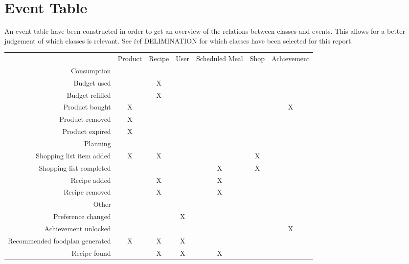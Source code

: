 \section{Event Table}
An event table have been constructed in order to get an overview of the relations between classes and events. This allows for a better judgement of which classes is relevant. See \.ref DELIMINATION for which classes have been selected for this report.
\begin{table}[h]
\begin{tabular}{r c c c c c c}
                          \vline           & Product& Recipe & User & Scheduled Meal & Shop & Achievement\\
 Consumption              \vline           &        &        &      &                &      &            \\   
 \hline    
 Budget used    		  \vline           &        &      X &      &                &      &            \\
 Budget refilled		  \vline	       &        &      X &      &                &      &            \\
 Product bought 		  \vline    	   &     X  &        &      &                &      &          X \\
 Product removed		  \vline    	   &     X  &        &      &                &      &            \\
 Product expired		  \vline	       &     X  &        &      &                &      &            \\
 \hline				
 Planning   	          \vline           &        &        &      &                &      &            \\
 \hline 
 Shopping list item added \vline    	   &     X  &      X &      &                &    X &            \\
 Shopping list completed  \vline	       &        &        &      &              X &    X &            \\
 Recipe added			  \vline	       &        &      X &      &              X &      &            \\
 Recipe removed           \vline	       &        &      X &      &              X &      &            \\
 \hline           
 Other                    \vline           &        &        &      &                &      &            \\ 
 \hline        
 Preference changed       \vline	       &        &        &   X  &                &      &            \\
 Achievement unlocked     \vline	       &        &        &      &                &      &          X \\
 Recommended foodplan generated \vline     &     X  &      X &    X &                &      &            \\
 Recipe found              \vline          &        &      X &    X &              X &      &            
\end{tabular}
\end{table}
